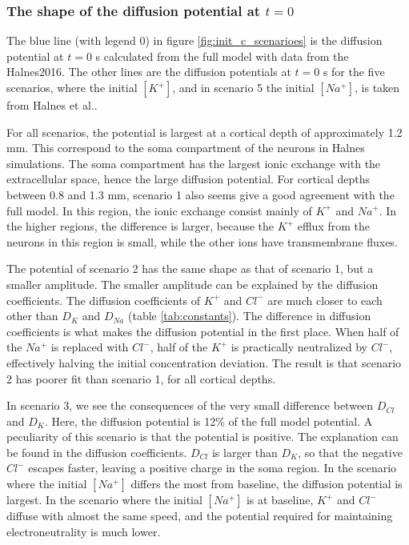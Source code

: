 \documentclass{article}
\begin{document}
\subsubsection{The shape of the diffusion potential at $t=0$}

The blue line (with legend 0) in figure \ref{fig:init_c_scenarioes} is the diffusion potential at $t=0$ s calculated from the full model with data from the Halnes2016. The other lines are the diffusion potentials at $t=0$ s for the five scenarios, where the initial $[K^+]$, and in scenario 5 the initial $[Na^+]$, is taken from Halnes et al..  

For all scenarios, the potential is largest at a cortical depth of approximately 1.2 mm. This correspond to the soma compartment of the neurons in Halnes simulations. The soma compartment has the largest ionic exchange with the extracellular space, hence the large diffusion potential. For cortical depths between 0.8 and 1.3 mm, scenario 1 also seems give a good agreement with the full model. In this region, the ionic exchange consist mainly of $K^+$ and $Na^+$. In the higher regions, the difference is larger, because the $K^+$ efflux from the neurons in this region is small, while the other ions have transmembrane fluxes. 

The potential of scenario 2 has the same shape as that of scenario 1, but a smaller amplitude. The smaller amplitude can be explained by the diffusion coefficients. The diffusion coefficients of $K^+$ and $Cl^-$ are much closer to each other than $D_K$ and $D_{Na}$ (table \ref{tab:constants}).  The difference in diffusion coefficients is what makes the diffusion potential in the first place. When half of the $Na^+ $ is replaced with $Cl^-$, half of the $K^+$ is practically neutralized by $Cl^-$, effectively halving the initial concentration deviation. The result is that scenario 2 has poorer fit than scenario 1, for all cortical depths. 

In scenario 3, we see the consequences of the very small difference between $D_{Cl}$ and $D_K$. Here, the diffusion potential is 12\% of the full model potential. A peculiarity of this scenario is that the potential is positive. The explanation can be found in the diffusion coefficients. $D_{Cl}$ is larger than $D_K$, so that the negative $Cl^-$ escapes faster, leaving a positive charge in the soma region. In the scenario where the initial $[Na^+]$ differs the most from baseline, the diffusion potential is largest. In the scenario where the initial $[Na^+]$ is at baseline, $K^+$ and $Cl^-$ diffuse with almost the same speed, and the potential required for maintaining electroneutrality is much lower. 
\end{document}
